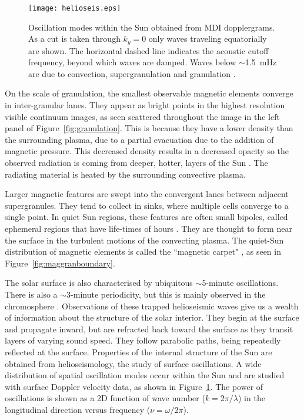  \begin{figure}[]    %
   \centerline{\texttt{[image: helioseis.eps]}
              }
              \caption[Oscillation modes within the Sun.]{Oscillation modes within the Sun obtained from MDI dopplergrams. As a cut is taken through $k_y=0$ only waves traveling equatorially are shown. The horizontal dashed line indicates the acoustic cutoff frequency, beyond which waves are damped. Waves below $\sim$1.5~mHz are due to convection, supergranulation and granulation \citep[from][]{Gizon:2010}.}
   \label{fig:photosc}
   \end{figure}

On the scale of granulation, the smallest observable magnetic elements converge in inter-granular lanes. They appear as bright points in the highest resolution visible continuum images, as seen scattered throughout the image in the left panel of Figure~\ref{fig:granulation}. This is because they have a lower density than the surrounding plasma, due to a partial evacuation due to the addition of magnetic pressure. This decreased density results in a decreased opacity so the observed radiation is coming from deeper, hotter, layers of the Sun \citep{Spruit:1976}. The radiating material is heated by the surrounding convective plasma. 
 
Larger magnetic features are swept into the convergent lanes between adjacent supergranules. They tend to collect in sinks, where multiple cells converge to a single point. In quiet Sun regions, these features are often small bipoles, called ephemeral regions that have life-times of hours \citep{Hagenaar:2001}. They are thought to form near the surface in the turbulent motions of the convecting plasma. The quiet-Sun distribution of magnetic elements is called the ``magnetic carpet" \citep{Schrijver:1997b}, as seen in Figure~\ref{fig:maggranboundary}.

The solar surface is also characterised by ubiquitous $\sim$5-minute oscillations. %
There is also a $\sim$3-minute periodicity, but this is mainly observed in the chromosphere \citep{Solanki:2003}. 
Observations of these trapped helioseismic waves give us a wealth of information about the structure of the solar interior. They begin at the surface and  propagate inward, but are refracted  back toward the surface as they transit layers of varying sound speed. They follow parabolic paths, being repeatedly reflected at the surface. Properties of the internal structure of the Sun are obtained from helioseismology, the study of surface oscillations. A wide distribution of spatial oscillation modes occur within the Sun and are studied with surface  Doppler velocity data, as shown in Figure~\ref{fig:photosc}. The power of oscillations is shown as a 2D function of wave number ($k = 2\pi/\lambda$) in the longitudinal direction versus frequency ($\nu = \omega/2\pi$).



